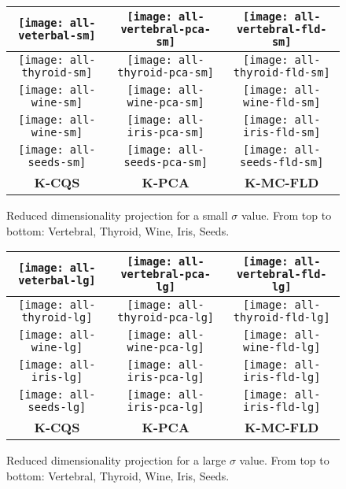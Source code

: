 \begin{center}
\begin{figure}[H]
\begin{centering}
\begin{tabular}{|c|c|c|}
\hline 
\texttt{[image: all-veterbal-sm]} & \texttt{[image: all-vertebral-pca-sm]} & \texttt{[image: all-vertebral-fld-sm]}\tabularnewline
\hline 
\texttt{[image: all-thyroid-sm]} & \texttt{[image: all-thyroid-pca-sm]} & \texttt{[image: all-thyroid-fld-sm]}\tabularnewline
\hline 
\texttt{[image: all-wine-sm]} & \texttt{[image: all-wine-pca-sm]} & \texttt{[image: all-wine-fld-sm]}\tabularnewline
\hline 
\texttt{[image: all-wine-sm]} & \texttt{[image: all-iris-pca-sm]} & \texttt{[image: all-iris-fld-sm]}\tabularnewline
\hline 
\texttt{[image: all-seeds-sm]} & \texttt{[image: all-seeds-pca-sm]} & \texttt{[image: all-seeds-fld-sm]}\tabularnewline
\hline 
\textbf{K-CQS} & \textbf{K-PCA} & \textbf{K-MC-FLD}\tabularnewline
\hline 
\end{tabular}
\par\end{centering}
\caption{Reduced dimensionality projection for a small $\sigma$ value. From
top to bottom: Vertebral, Thyroid, Wine, Iris, Seeds.\label{fig:category-space-reduced-md-sigma}}
\end{figure}
\par\end{center}

\begin{center}
\begin{figure}[H]
\begin{centering}
\begin{tabular}{|c|c|c|}
\hline 
\texttt{[image: all-veterbal-lg]} & \texttt{[image: all-vertebral-pca-lg]} & \texttt{[image: all-vertebral-fld-lg]}\tabularnewline
\hline 
\texttt{[image: all-thyroid-lg]} & \texttt{[image: all-thyroid-pca-lg]} & \texttt{[image: all-thyroid-fld-lg]}\tabularnewline
\hline 
\texttt{[image: all-wine-lg]} & \texttt{[image: all-wine-pca-lg]} & \texttt{[image: all-wine-fld-lg]}\tabularnewline
\hline 
\texttt{[image: all-iris-lg]} & \texttt{[image: all-iris-pca-lg]} & \texttt{[image: all-iris-fld-lg]}\tabularnewline
\hline 
\texttt{[image: all-seeds-lg]} & \texttt{[image: all-iris-pca-lg]} & \texttt{[image: all-iris-fld-lg]}\tabularnewline
\hline 
\textbf{K-CQS} & \textbf{K-PCA} & \textbf{K-MC-FLD}\tabularnewline
\hline 
\end{tabular}
\par\end{centering}
\caption{Reduced dimensionality projection for a large $\sigma$ value. From
top to bottom: Vertebral, Thyroid, Wine, Iris, Seeds.\label{fig:category-space-reduced-lg-sigma}}
\end{figure}
\par\end{center}
